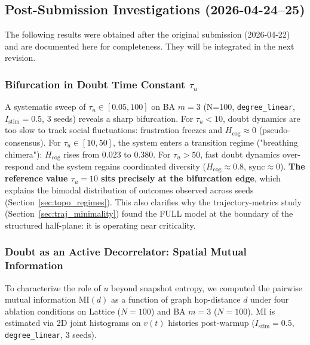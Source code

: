 \documentclass[11pt]{article}
\begin{document}

\subsection{Post-Submission Investigations (2026-04-24--25)}
\label{sec:addendum}

The following results were obtained after the original submission (2026-04-22) and are documented here for completeness. They will be integrated in the next revision.

\subsubsection*{Bifurcation in Doubt Time Constant $\tau_u$}

A systematic sweep of $\tau_u \in [0.05, 100]$ on BA $m=3$ (N=100, \texttt{degree\_linear}, $I_{\mathrm{stim}}=0.5$, 3 seeds) reveals a sharp bifurcation. For $\tau_u < 10$, doubt dynamics are too slow to track social fluctuations: frustration freezes and $H_{\mathrm{cog}} \approx 0$ (pseudo-consensus). For $\tau_u \in [10, 50]$, the system enters a transition regime ("breathing chimera"): $H_{\mathrm{cog}}$ rises from $0.023$ to $0.380$. For $\tau_u > 50$, fast doubt dynamics over-respond and the system regains coordinated diversity ($H_{\mathrm{cog}} \approx 0.8$, $\mathrm{sync} \approx 0$). \textbf{The reference value $\tau_u = 10$ sits precisely at the bifurcation edge}, which explains the bimodal distribution of outcomes observed across seeds (Section~\ref{sec:topo_regimes}). This also clarifies why the trajectory-metrics study (Section~\ref{sec:traj_minimality}) found the FULL model at the boundary of the structured half-plane: it is operating near criticality.

\subsubsection*{Doubt as an Active Decorrelator: Spatial Mutual Information}
\label{sec:mi_analysis}

To characterize the role of $u$ beyond snapshot entropy, we computed the pairwise mutual information MI$(d)$ as a function of graph hop-distance $d$ under four ablation conditions on Lattice ($N=100$) and BA $m=3$ ($N=100$). MI is estimated via 2D joint histograms on $v(t)$ histories post-warmup ($I_{\mathrm{stim}}=0.5$, \texttt{degree\_linear}, 3 seeds).
\end{document}

